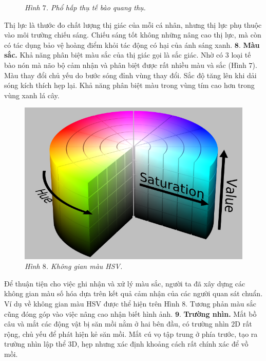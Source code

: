 \begin{multicols}{2}
\begin{figure}[H]
		\caption{\small\textit{\color{timhieukhoahoc}Hình $7$. Phổ hấp thụ tế bào quang thụ.}}
		\vspace*{-5pt}
	\end{figure}
	Thị lực là thước đo chất lượng thị giác của mỗi cá nhân, nhưng thị lực phụ thuộc vào môi trường chiếu sáng. Chiếu sáng tốt không những nâng cao thị lực, mà còn có tác dụng bảo vệ hoàng điểm khỏi tác động có hại của ánh sáng xanh. 
	\vskip 0.1cm
	$\pmb{8.}$ \textbf{\color{timhieukhoahoc}Màu sắc.}
	\vskip 0.1cm
	Khả năng phân biệt màu sắc của thị giác gọi là sắc giác. Nhờ có $3$ loại tế bào nón mà não bộ cảm nhận và phân biệt được rất nhiều màu và sắc (Hình $7$). Màu thay đổi chủ yếu do bước sóng đỉnh vùng thay đổi. Sắc độ tăng lên khi dải sóng kích thích hẹp lại.
	\vskip 0.1cm
	Khả năng phân biệt màu trong vùng tím cao hơn trong vùng xanh lá cây. 
	\begin{figure}[H]
		\vspace*{-5pt}
		\centering
		\captionsetup{labelformat= empty, justification=centering}
		\includegraphics[width= 1\linewidth]{8}
		\caption{\small\textit{\color{timhieukhoahoc}Hình $8$. Không gian màu HSV.}}
		\vspace*{-10pt}
	\end{figure}
	Để thuận tiện cho việc ghi nhận và xử lý màu sắc, người ta đã xây dựng các không gian màu số hóa dựa trên kết quả cảm nhận của các người quan sát chuẩn. Ví dụ về không gian màu HSV được thể hiện trên Hình $8$.
	\vskip 0.1cm
	Tương phản màu sắc cũng đóng góp vào việc nâng cao nhận biết hình ảnh.
	\vskip 0.1cm
	$\pmb{9.}$ \textbf{\color{timhieukhoahoc}Trường nhìn.}
	\vskip 0.1cm 
	Mắt bồ câu và mắt các động vật bị săn mồi nằm ở hai bên đầu, có trường nhìn $2$D rất rộng, chủ yếu để phát hiện kẻ săn mồi. Mắt cú vọ tập trung ở phía trước, tạo ra trường nhìn lập thể $3$D, hẹp nhưng xác định khoảng cách rất chính xác để vồ mồi. 

\end{multicols}

